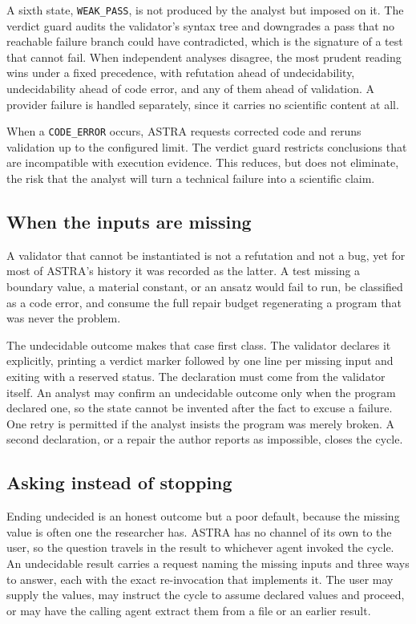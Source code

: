 \documentclass[11pt,a4paper]{article}
\begin{document}
A sixth state, \texttt{WEAK\_PASS}, is not produced by the analyst but imposed on it. The verdict guard audits the validator's syntax tree and downgrades a pass that no reachable failure branch could have contradicted, which is the signature of a test that cannot fail. When independent analyses disagree, the most prudent reading wins under a fixed precedence, with refutation ahead of undecidability, undecidability ahead of code error, and any of them ahead of validation. A provider failure is handled separately, since it carries no scientific content at all.

When a \texttt{CODE\_ERROR} occurs, ASTRA requests corrected code and reruns validation up to the configured limit. The verdict guard restricts conclusions that are incompatible with execution evidence. This reduces, but does not eliminate, the risk that the analyst will turn a technical failure into a scientific claim.

\subsection{When the inputs are missing}

A validator that cannot be instantiated is not a refutation and not a bug, yet for most of ASTRA's history it was recorded as the latter. A test missing a boundary value, a material constant, or an ansatz would fail to run, be classified as a code error, and consume the full repair budget regenerating a program that was never the problem.

The undecidable outcome makes that case first class. The validator declares it explicitly, printing a verdict marker followed by one line per missing input and exiting with a reserved status. The declaration must come from the validator itself. An analyst may confirm an undecidable outcome only when the program declared one, so the state cannot be invented after the fact to excuse a failure. One retry is permitted if the analyst insists the program was merely broken. A second declaration, or a repair the author reports as impossible, closes the cycle.

\subsection{Asking instead of stopping}

Ending undecided is an honest outcome but a poor default, because the missing value is often one the researcher has. ASTRA has no channel of its own to the user, so the question travels in the result to whichever agent invoked the cycle. An undecidable result carries a request naming the missing inputs and three ways to answer, each with the exact re-invocation that implements it. The user may supply the values, may instruct the cycle to assume declared values and proceed, or may have the calling agent extract them from a file or an earlier result.
\end{document}
